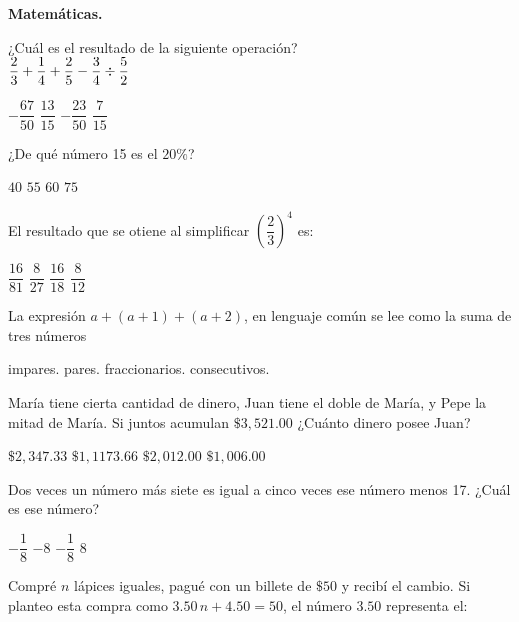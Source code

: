 \documentclass[12pt, letter]{exam}
\begin{document}
\textbf{Matemáticas.}
\begin{multicols}{2}
\begin{questions}
    \question ¿Cuál es el resultado de la siguiente operación?
    \\
    $\dfrac{2}{3} + \dfrac{1}{4} + \dfrac{2}{5} - \dfrac{3}{4} \divisionsymbol \dfrac{5}{2}$
    \begin{choices}
        \choice $- \dfrac{67}{50}$
        \choice $\dfrac{13}{15}$
        \choice $- \dfrac{23}{50}$
        \choice $\dfrac{7}{15}$
    \end{choices}
    \answerline
    \question ¿De qué número 15 es el $20\%$?
    \begin{choices}
        \choice $40$
        \choice $55$
        \choice $60$
        \choice $75$
    \end{choices}
    \answerline
    \question El resultado que se otiene al simplificar $\left( \dfrac{2}{3}\right)^{4}$ es:
    \begin{choices}
        \choice $\dfrac{16}{81}$
        \choice $\dfrac{8}{27}$
        \choice $\dfrac{16}{18}$
        \choice $\dfrac{8}{12}$
    \end{choices}
    \answerline
    \question La expresión $a + (a +1) + (a +2)$, en lenguaje común se lee como la suma de tres números
    \begin{choices}
        \choice impares.
        \choice pares.
        \choice fraccionarios.
        \choice consecutivos.
    \end{choices}
    \answerline
    \question María tiene cierta cantidad de dinero, Juan tiene el doble de María, y Pepe la mitad de María. Si juntos acumulan $\$3, 521.00$ ¿Cuánto dinero posee Juan?
    \begin{choices}
        \choice $\$2, 347.33$
        \choice $\$1, 1173.66$
        \choice $\$2, 012.00$
        \choice $\$1, 006.00$
    \end{choices}
    \answerline
    \question Dos veces un número más siete es igual a cinco veces ese número menos 17. ¿Cuál es ese número?
    \begin{choices}
        \choice $- \dfrac{1}{8}$
        \choice $- 8$
        \choice $- \dfrac{1}{8}$
        \choice $8$
    \end{choices}
    \answerline
    \question Compré $n$ lápices iguales, pagué con un billete de $\$50$ y recibí el cambio. Si planteo esta compra como $3.50 \, n + 4.50 = 50$, el número $3.50$ representa el:
    \begin{choices}

\end{choices}
\end{questions}
\end{multicols}
\end{document}
